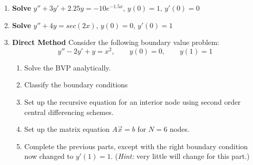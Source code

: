 \documentclass[letterpaper, fontsize=11pt]{scrartcl} %
\numberwithin{equation}{section} %
\numberwithin{figure}{section} %
\numberwithin{table}{section} %
\begin{document}
\begin{enumerate}
\item \textbf{Solve} $y'' + 3y' + 2.25y = -10e^{-1.5x}$, $y(0) = 1$, $y'(0) = 0$ 

\item \textbf{Solve} $y'' + 4y = sec(2x) $, $y(0) = 0$, $y'(0) = 1$

\item \textbf{Direct Method} Consider the following boundary value problem:
$$y'' - 2y' + y = x^2,\qquad y(0) = 0, \qquad y(1) = 1$$
\begin{enumerate}
\item Solve the BVP analytically.
\item Classify the boundary conditions
\item Set up the recursive equation for an interior node using second order central differencing schemes.
\item Set up the matrix equation $A\vec x = b$ for $N = 6$ nodes. 
\item Complete the previous parts, except with the right boundary condition now changed to $y'(1) = 1$. (\textit{Hint:} very little will change for this part.)
\end{enumerate}



\end{enumerate}
\end{document}

